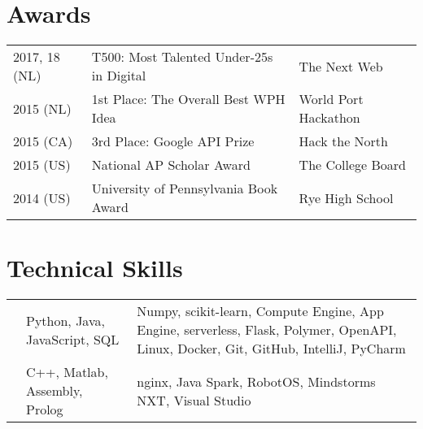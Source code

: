 \documentclass[]{deedy-resume-openfont}
\begin{document}
\begin{minipage}[t]{0.66\textwidth}

\section{Awards} 
\begin{tabular}{lll}
2017, 18 (NL)   & T500: Most Talented Under-25s in Digital  & The Next Web\\
2015 (NL)   & 1st Place: The Overall Best WPH Idea      & World Port Hackathon\\
2015 (CA)   & 3rd Place: Google API Prize               & Hack the North\\
2015 (US)   & National AP Scholar Award                 & The College Board\\
2014 (US)   & University of Pennsylvania Book Award     & Rye High School\\
\end{tabular}
\vspace{0.1\topsep}


\section{Technical Skills}
\vspace{-\topsep}
\settowidth{}
\begin{tabulary}{\linewidth}{LLL}
    &  &  \\
    \hline
     & Python, Java, JavaScript, SQL & Numpy, scikit-learn, Compute Engine, App Engine, serverless, Flask, Polymer, OpenAPI, Linux, Docker, Git, GitHub, IntelliJ, PyCharm \\
    \hline
     & C++, Matlab, Assembly, Prolog & nginx, Java Spark, RobotOS, Mindstorms NXT, Visual Studio
\end{tabulary} 

\end{minipage} 
\end{document}

